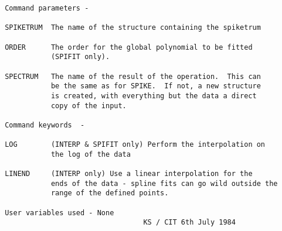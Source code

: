 \begin{description}
\begin{verbatim}
 Command parameters -

 SPIKETRUM  The name of the structure containing the spiketrum

 ORDER      The order for the global polynomial to be fitted
            (SPIFIT only).

 SPECTRUM   The name of the result of the operation.  This can
            be the same as for SPIKE.  If not, a new structure
            is created, with everything but the data a direct
            copy of the input.

 Command keywords  -

 LOG        (INTERP & SPIFIT only) Perform the interpolation on
            the log of the data

 LINEND     (INTERP only) Use a linear interpolation for the
            ends of the data - spline fits can go wild outside the
            range of the defined points.

 User variables used - None
                                  KS / CIT 6th July 1984
\end{verbatim}
\end{description}

